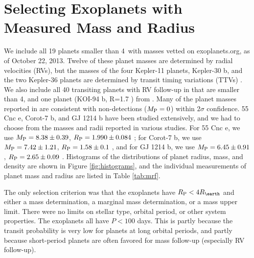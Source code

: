 \documentclass[iop]{emulateapj}
\begin{document}
\section{Selecting Exoplanets with Measured Mass and Radius}
We include all 19 planets smaller than 4\rearth\ with masses vetted on exoplanets.org, as of October 22, 2013.  Twelve of these planet masses are determined by radial velocities (RVs), but the masses of the four Kepler-11 planets, Kepler-30 b, and the two Kepler-36 planets are determined by transit timing variations (TTVs) \citep{Lissauer2013, Sanchis-Ojeda2012, Carter2012}. We also include all 40 transiting planets with RV follow-up in \citet{Marcy2013} that are smaller than 4\rearth, and one planet (KOI-94 b, R=1.7 \rearth) from \citet{Weiss2013}.  Many of the planet masses reported in \citet{Marcy2013} are consistent with non-detections ($M_{\rm P}=0$) within $2\sigma$ confidence.  55 Cnc e, Corot-7 b, and GJ 1214 b have been studied extensively, and we had to choose from the masses and radii reported in various studies.  For 55 Cnc e, we use $M_{\rm P} = 8.38\pm0.39$, $R_{\rm P} = 1.990\pm0.084$ \citep{Endl2012,Dragomir2013}; for Corot-7 b, we use $M_{\rm P} =7.42\pm1.21$, $R_{\rm P}= 1.58\pm 0.1$ \citep{Hatzes2011}, and for GJ 1214 b, we use $M_{\rm P} =6.45\pm0.91 $, $R_{\rm P}= 2.65\pm0.09$ \citep{Carter2011}.  Histograms of the distributions of planet radius, mass, and density are shown in Figure \ref{fig:histograms}, and the individual measurements of planet mass and radius are listed in Table \ref{tab:mrf}.

The only selection criterion was that the exoplanets have $\rpl < 4 \rearth$ and either a mass determination, a marginal mass determination, or a mass upper limit.  There were no limits on stellar type, orbital period, or other system properties.  The exoplanets all have $P < 100$ days.  This is partly because the transit probability is very low for planets at long orbital periods, and partly because short-period planets are often favored for mass follow-up (especially RV follow-up).
\end{document}
